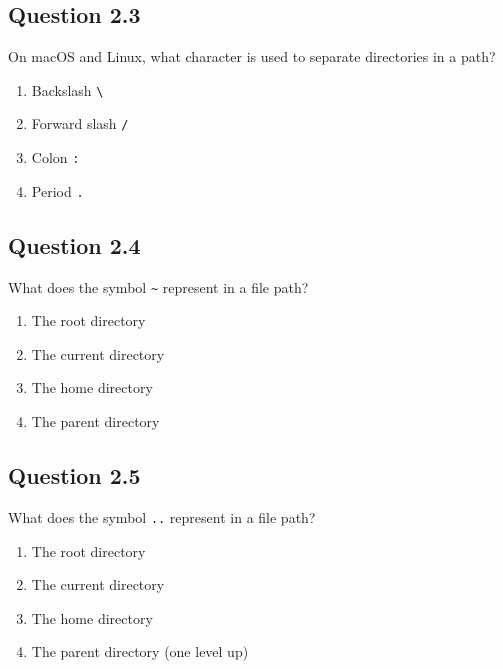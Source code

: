 \documentclass[
  letterpaper,
  DIV=11,
  numbers=noendperiod]{scrreprt}
\providecommand{\tightlist}{%
  \setlength{\itemsep}{0pt}\setlength{\parskip}{0pt}}
\begin{document}
\subsection{Question 2.3}\label{question-2.3}

On macOS and Linux, what character is used to separate directories in a
path?

\begin{enumerate}
\def\labelenumi{\Alph{enumi})}
\tightlist
\item
  Backslash \texttt{\textbackslash{}}\\
\item
  Forward slash \texttt{/}\\
\item
  Colon \texttt{:}\\
\item
  Period \texttt{.}
\end{enumerate}

\subsection{Question 2.4}\label{question-2.4}

What does the symbol \texttt{\textasciitilde{}} represent in a file
path?

\begin{enumerate}
\def\labelenumi{\Alph{enumi})}
\tightlist
\item
  The root directory\\
\item
  The current directory\\
\item
  The home directory\\
\item
  The parent directory
\end{enumerate}

\subsection{Question 2.5}\label{question-2.5}

What does the symbol \texttt{..} represent in a file path?

\begin{enumerate}
\def\labelenumi{\Alph{enumi})}
\tightlist
\item
  The root directory\\
\item
  The current directory\\
\item
  The home directory\\
\item
  The parent directory (one level up)
\end{enumerate}
\end{document}
